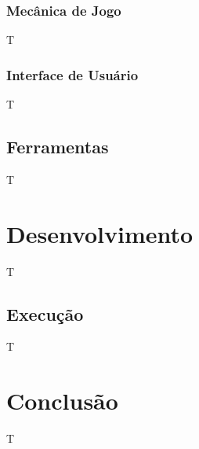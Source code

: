 \documentclass[10pt,a4paper]{report}
\begin{document}
\subsection{Mecânica de Jogo}
T
\subsection{Interface de Usuário}
T
\section{Ferramentas}
T
\chapter{Desenvolvimento}
T
\section{Execução}
T
\chapter{Conclusão}
T
\end{document}
